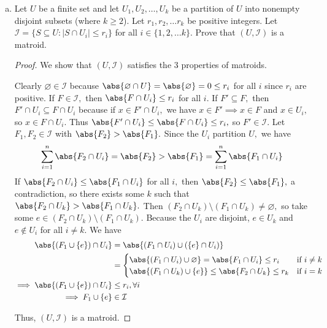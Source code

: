 \documentclass{article}
\begin{document}
\begin{enumerate}[(a)]
	\item Let $U$ be a finite set and let $U_1, U_2, \dots, U_k$ be a partition of $U$ into nonempty disjoint subsets (where $k \geq 2$).  Let $r_1, r_2, \dots r_k$ be positive integers.  Let $\mathcal I = \{ S \subseteq U : |S \cap U_i| \leq r_i\}$ for all $i \in \{1,2,\dots k\}$.  Prove that $(U, \mathcal I)$ is a matroid.  
		\begin{proof}
			We show that $(U, \mathcal I)$ satisfies the 3 properties of matroids. 
			\begin{enumerate}[(i)]
				\ii Clearly $\varnothing\in\mathcal I$ because $\abs{\varnothing\cap U}=\abs{\varnothing}=0\le r_i$ for all $i$ since $r_i$ are positive.
				\ii If $F\in \mathcal I,$ then $\abs{F\cap U_i}\le r_i$ for all $i.$ If $F'\subseteq F,$ then $F'\cap U_i\subseteq F\cap U_i$ because if $x\in F'\cap U_i,$ we have $x\in F'\implies x\in F$ and $x\in U_i,$ so $x\in F\cap U_i.$ Thus $\abs{F'\cap U_i}\le \abs{F\cap U_i}\le r_i,$ so $F'\in\mathcal I.$
				\ii Let $F_1, F_2\in\mathcal I$ with $\abs{F_2}>\abs{F_1}.$ Since the $U_i$ partition $U,$ we have
				\begin{align*}
					\sum_{i=1}^{n} \abs{F_2\cap U_i} = \abs{F_2} > \abs{F_1} = \sum_{i=1}^{n} \abs{F_1\cap U_i}
				\end{align*}
				If $\abs{F_2\cap U_i}\le\abs{F_1\cap U_i}$ for all $i,$ then $\abs{F_2}\le \abs{F_1},$ a contradiction, so there exists some $k$ such that $\abs{F_2\cap U_k}>\abs{F_1\cap U_k}.$ Then $(F_2\cap U_k)\setminus(F_1\cap U_k)\neq\varnothing,$ so take some $e\in (F_2\cap U_k)\setminus(F_1\cap U_k).$ Because the $U_i$ are disjoint, $e\in U_k$ and $e\notin U_i$ for all $i\neq k.$ We have
				\begin{align*}
					\abs{\left( F_1\cup \left\{ e \right\} \right)\cap U_i} &= \abs{\left( F_1\cap U_i \right)\cup \left( \left\{ e \right\}\cap U_i \right)} \\
					&= \begin{cases}
						\abs{(F_1\cap U_i)\cup\varnothing} = \abs{F_1\cap U_i} \le r_i & \text{if }i\neq k \\
						\abs{(F_1\cap U_k)\cup \left\{ e \right\}} \le \abs{F_2\cap U_k} \le r_k & \text{if } i=k
					\end{cases} \\
					\implies \abs{(F_1\cup \left\{ e \right\})\cap U_i} &\le r_i, \forall i \\
					\implies F_1\cup \left\{ e \right\}&\in \mathcal I
				\end{align*}
			\end{enumerate}
			Thus, $(U, \mathcal I)$ is a matroid.
		\end{proof}

\end{enumerate}
\end{document}

